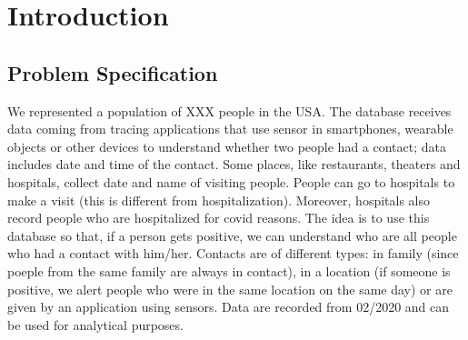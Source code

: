 \documentclass[12pt, a4paper]{article}
\begin{document}
\clearpage

\tableofcontents

\listoftodos

\clearpage

\section{Introduction}

\subsection{Problem Specification}

We represented a population of XXX  people in the USA.  
The database receives data coming from tracing applications that use sensor in smartphones, wearable objects or other devices to understand whether two people had a contact; data includes date and time of the contact.  
Some places, like restaurants, theaters and hospitals, collect date and name of visiting people. People can go to hospitals to make a visit (this is different from hospitalization). Moreover, hospitals also record people who are hospitalized for covid reasons. 
The idea is to use this database so that, if a person gets positive, we can understand who are all people who had a contact with him/her. Contacts are of different types: in family (since poeple from the same family are always in contact), in a location (if someone is positive, we alert people who were in the same location on the same day) or are given by an application using sensors. Data are recorded from 02/2020 and can be used for analytical purposes. 
\end{document}
